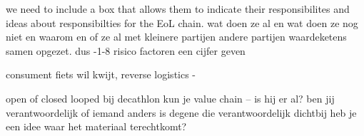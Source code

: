 we need to include a box that allows them to indicate their responsibilites and ideas about responsibilties for the EoL chain.
wat doen ze al
en wat doen ze nog niet en waarom
en of ze al met kleinere partijen andere partijen waardeketens samen opgezet.
dus -1-8 risico factoren een cijfer geven

consument fiets wil kwijt, reverse logistics - 

open of closed looped
bij decathlon kun je 
value chain -- is hij er al?
ben jij verantwoordelijk of iemand anders
is degene die verantwoordelijk dichtbij
heb je een idee waar het materiaal terechtkomt?
